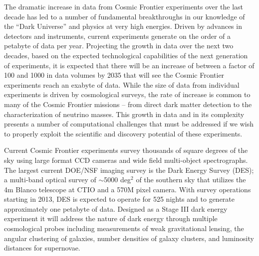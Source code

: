 The dramatic increase in data from Cosmic Frontier experiments over
the last decade has led to a number of fundamental breakthroughs in
our knowledge of the ``Dark Universe'' and physics at very high
energies. Driven by advances in detectors and instruments, current
experiments generate on the order of a petabyte of data per
year. Projecting the growth in data over the next two decades, based
on the expected technological capabilities of the next generation of
experiments, it is expected that there will be an increase of between
a factor of 100 and 1000 in data volumes by 2035 that will see the
Cosmic Frontier experiments reach an exabyte of data. While the size
of data from individual experiments is driven by cosmological surveys,
the rate of increase is common to many of the Cosmic Frontier missions
-- from direct dark matter detection to the characterization of
neutrino masses. This growth in data and in its complexity presents a
number of computational challenges that must be addressed if we wish
to properly exploit the scientific and discovery potential of these
experiments.

\medskip


Current Cosmic Frontier experiments survey thousands of square degrees
of the sky using large format CCD cameras and wide field multi-object
spectrographs. The largest current DOE/NSF imaging survey is the Dark
Energy Survey (DES); a multi-band optical survey of
$\sim$5000 deg$^{2}$ of the southern sky that utilizes the 4m Blanco
telescope at CTIO and a 570M pixel camera. With survey operations
starting in 2013, DES is expected to operate for 525 nights and to
generate approximately one petabyte of data. Designed as a Stage III
dark energy experiment it will address the nature of dark energy
through multiple cosmological probes including measurements of weak
gravitational lensing, the angular clustering of galaxies, number
densities of galaxy clusters, and luminosity distances for
supernovae. 

